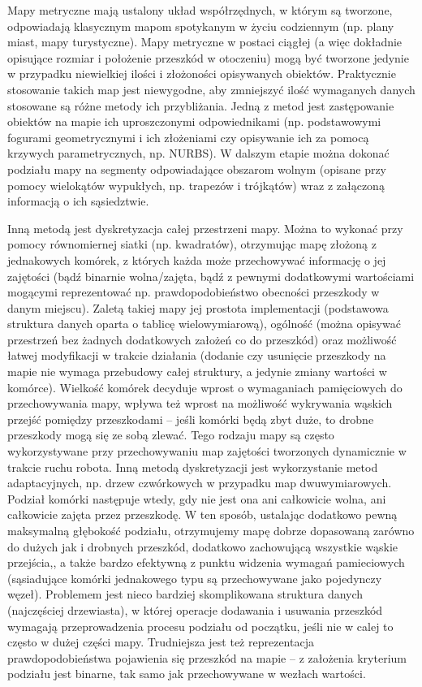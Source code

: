 Mapy metryczne mają ustalony układ współrzędnych, w którym są tworzone, odpowiadają
klasycznym mapom spotykanym w życiu codziennym (np. plany miast, mapy turystyczne).
Mapy metryczne w postaci ciągłej (a więc dokładnie opisujące rozmiar i położenie
przeszkód w otoczeniu) mogą być tworzone jedynie w przypadku niewielkiej ilości
i złożoności opisywanych obiektów. Praktycznie stosowanie takich map jest niewygodne,
aby zmniejszyć ilość wymaganych danych stosowane są różne metody ich przybliżania.
Jedną z metod jest zastępowanie obiektów na mapie ich uproszczonymi odpowiednikami
(np. podstawowymi fogurami geometrycznymi i ich złożeniami czy opisywanie ich za pomocą
krzywych parametrycznych, np. NURBS). W dalszym etapie można dokonać podziału mapy
na segmenty odpowiadające obszarom wolnym (opisane przy pomocy wielokątów wypukłych,
np. trapezów i trójkątów) wraz z załączoną informacją o ich sąsiedztwie.

Inną metodą jest dyskretyzacja całej przestrzeni mapy. Można to wykonać przy pomocy
równomiernej siatki (np. kwadratów), otrzymując mapę złożoną z jednakowych komórek,
z których każda może przechowywać informację o jej zajętości (bądź binarnie wolna/zajęta,
bądź z pewnymi dodatkowymi wartościami mogącymi reprezentować np. prawdopodobieństwo
obecności przeszkody w danym miejscu). Zaletą takiej mapy jej prostota implementacji
(podstawowa struktura danych oparta o tablicę wielowymiarową), ogólność (można opisywać
przestrzeń bez żadnych dodatkowych założeń co do przeszkód) oraz możliwość łatwej modyfikacji
w trakcie działania (dodanie czy usunięcie przeszkody na mapie nie wymaga przebudowy
całej struktury, a jedynie zmiany wartości w komórce). Wielkość komórek decyduje wprost
o wymaganiach pamięciowych do przechowywania mapy, wpływa też wprost na możliwość
wykrywania wąskich przejść pomiędzy przeszkodami -- jeśli komórki będą zbyt duże, to
drobne przeszkody mogą się ze sobą zlewać. Tego rodzaju mapy są często wykorzystywane
przy przechowywaniu map zajętości tworzonych dynamicznie w trakcie ruchu robota.
Inną metodą dyskretyzacji jest wykorzystanie metod adaptacyjnych, np. drzew czwórkowych
w przypadku map dwuwymiarowych. Podział komórki następuje wtedy, gdy nie jest ona
ani całkowicie wolna, ani całkowicie zajęta przez przeszkodę. W ten sposób, ustalając
dodatkowo pewną maksymalną głębokość podziału, otrzymujemy mapę dobrze dopasowaną
zarówno do dużych jak i drobnych przeszkód, dodatkowo zachowującą wszystkie wąskie
przejścia,, a także bardzo efektywną z punktu widzenia wymagań pamieciowych (sąsiadujące
komórki jednakowego typu są przechowywane jako pojedynczy węzeł). Problemem jest
nieco bardziej skomplikowana struktura danych (najczęściej drzewiasta), w której
operacje dodawania i usuwania przeszkód wymagają przeprowadzenia procesu podziału
od początku, jeśli nie w calej to często w dużej części mapy. Trudniejsza jest też
reprezentacja prawdopodobieństwa pojawienia się przeszkód na mapie -- z założenia kryterium
podziału jest binarne, tak samo jak przechowywane w wezłach wartości.

